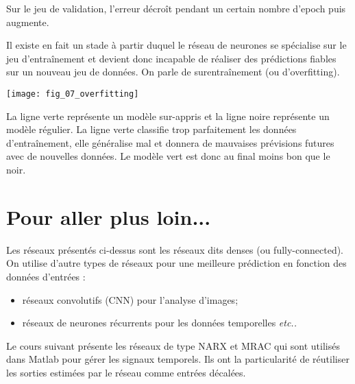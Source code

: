 Sur le jeu de validation, l'erreur décroît pendant un certain nombre d'epoch puis augmente. 

Il existe en fait un stade à partir duquel le réseau de neurones se spécialise sur le jeu d’entraînement et devient donc incapable de réaliser des prédictions fiables sur un nouveau jeu de données. On parle de surentraînement (ou d'overfitting).
 

\begin{marginfigure}
\texttt{[image: fig\_07\_overfitting]}
\end{marginfigure}

\begin{exemple} [Wikipedia]
La ligne verte représente un modèle sur-appris et la ligne noire représente un modèle régulier. La ligne verte classifie trop parfaitement les données d’entraînement, elle généralise mal et donnera de mauvaises prévisions futures avec de nouvelles données. Le modèle vert est donc au final moins bon que le noir.
\end{exemple}



\section{Pour aller plus loin...}

Les réseaux présentés ci-dessus sont les réseaux dits denses (ou fully-connected). On utilise d'autre types de réseaux pour une meilleure prédiction en fonction des données d'entrées : 
\begin{itemize}
\item réseaux convolutifs (CNN) pour l'analyse d'images;
\item réseaux de neurones récurrents pour les données temporelles \textit{etc..}
\end{itemize}

Le cours suivant présente les réseaux de type NARX et MRAC qui sont utilisés dans Matlab pour gérer les signaux temporels. Ils ont la particularité de réutiliser les sorties estimées par le réseau comme entrées décalées. 



